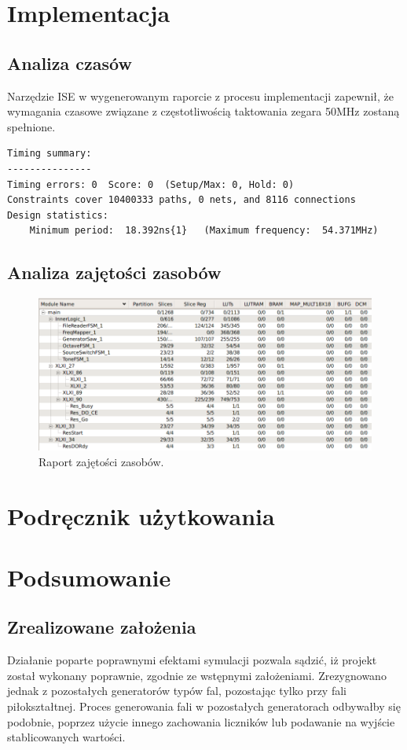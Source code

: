 \documentclass[12pt]{article}
\begin{document}
\section{Implementacja}
\subsection{Analiza czasów}
Narzędzie ISE w wygenerowanym raporcie z procesu implementacji zapewnił, że wymagania czasowe związane z częstotliwością taktowania zegara 50MHz zostaną spełnione.
\begin{lstlisting}
Timing summary: 
--------------- 
Timing errors: 0  Score: 0  (Setup/Max: 0, Hold: 0) 
Constraints cover 10400333 paths, 0 nets, and 8116 connections 
Design statistics: 
    Minimum period:  18.392ns{1}   (Maximum frequency:  54.371MHz) 
\end{lstlisting}

\subsection{Analiza zajętości zasobów}
\begin{figure}[h]
  \centering
  \includegraphics[width=\linewidth]{images/area}
  \caption{Raport zajętości zasobów.}
  \label{hardware}
\end{figure}

\section{Podręcznik użytkowania}

\section{Podsumowanie}

\subsection{Zrealizowane założenia}
Działanie poparte poprawnymi efektami symulacji pozwala sądzić, iż projekt został wykonany poprawnie, zgodnie ze wstępnymi założeniami. Zrezygnowano jednak z pozostałych generatorów typów fal, pozostając tylko przy fali piłokształtnej. Proces generowania fali w pozostałych generatorach odbywałby się podobnie, poprzez użycie innego zachowania liczników lub podawanie na wyjście stablicowanych wartości.
\end{document}
